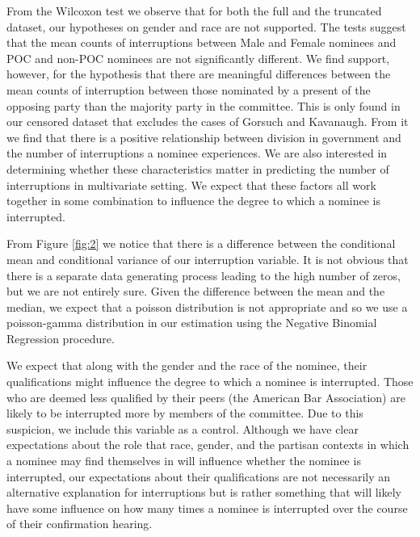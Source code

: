 \documentclass [12pt]{article}
\begin{document}
From the Wilcoxon test we observe that for both the full and the truncated dataset, our hypotheses on gender and race are not supported. The tests suggest that the mean counts of interruptions between Male and Female nominees and POC and non-POC nominees are not significantly different. We find support, however, for the hypothesis that there are meaningful differences between the mean counts of interruption between those nominated by a present of the opposing party than the majority party in the committee. This is only found in our censored dataset that excludes the cases of Gorsuch and Kavanaugh. From it we find that there is a positive relationship between division in government and the number of interruptions a nominee experiences. We are also interested in determining whether these characteristics matter in predicting the number of interruptions in multivariate setting. We expect that these factors all work together in some combination to influence the degree to which a nominee is interrupted. 

From Figure \ref{fig:2} we notice that there is a difference between the conditional mean and conditional variance of our interruption variable. It is not obvious that there is a separate data generating process leading to the high number of zeros, but we are not entirely sure. Given the difference between the mean and the median, we expect that a poisson distribution is not appropriate and so we use a poisson-gamma distribution in our estimation using the Negative Binomial Regression procedure.

We expect that along with the gender and the race of the nominee, their qualifications might influence the degree to which a nominee is interrupted. Those who are deemed less qualified by their peers (the American Bar Association) are likely to be interrupted more by members of the committee. Due to this suspicion, we include this variable as a control. Although we have clear expectations about the role that race, gender, and the partisan contexts in which a nominee may find themselves in will influence whether the nominee is interrupted, our expectations about their qualifications are not necessarily an alternative explanation for interruptions but is rather something that will likely have some influence on how many times a nominee is interrupted over the course of their confirmation hearing.	    
	    

\end{document}
